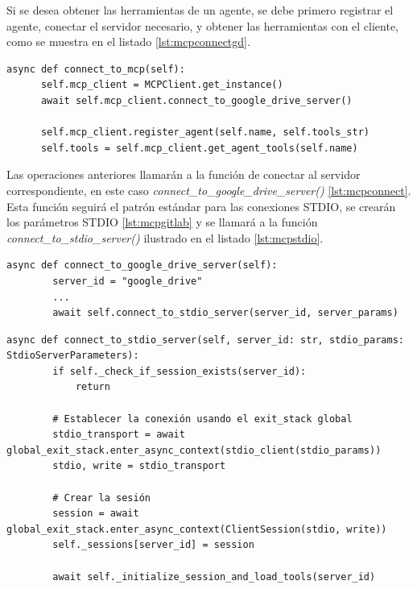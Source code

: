 Si se desea obtener las herramientas de un agente, se debe primero registrar el agente, conectar el servidor necesario, y obtener las herramientas con el cliente, como se muestra en el listado \ref{lst:mcpconnectgd}. 

\begin{lstlisting}[caption={Función \textit{connect\_to\_mcp en agente Google Drive}},label={lst:mcpconnectgd}]
  async def connect_to_mcp(self):
      self.mcp_client = MCPClient.get_instance()
      await self.mcp_client.connect_to_google_drive_server()

      self.mcp_client.register_agent(self.name, self.tools_str)
      self.tools = self.mcp_client.get_agent_tools(self.name)
\end{lstlisting}

Las operaciones anteriores llamarán a la función de conectar al servidor correspondiente, en este caso \textit{connect\_to\_google\_drive\_server()} \ref{lst:mcpconnect}. Esta función seguirá el patrón estándar para las conexiones STDIO, se crearán los parámetros STDIO \ref{lst:mcpgitlab} y se llamará a la función \textit{connect\_to\_stdio\_server()} ilustrado en el listado \ref{lst:mcpstdio}. 

\begin{lstlisting}[caption={Función \textit{connect\_to\_google\_drive\_server en Cliente MCP}},label={lst:mcpconnect}]
    async def connect_to_google_drive_server(self):
        server_id = "google_drive"
        ...
        await self.connect_to_stdio_server(server_id, server_params)
\end{lstlisting}

\begin{lstlisting}[caption={Función \textit{connect\_to\_stdio\_server en cliente MCP}},label={lst:mcpstdio}]
    async def connect_to_stdio_server(self, server_id: str, stdio_params: StdioServerParameters):
        if self._check_if_session_exists(server_id):
            return

        # Establecer la conexión usando el exit_stack global
        stdio_transport = await global_exit_stack.enter_async_context(stdio_client(stdio_params))
        stdio, write = stdio_transport

        # Crear la sesión
        session = await global_exit_stack.enter_async_context(ClientSession(stdio, write))
        self._sessions[server_id] = session

        await self._initialize_session_and_load_tools(server_id)

\end{lstlisting}

